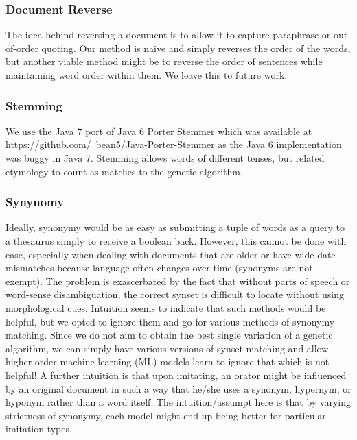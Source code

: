 
\subsubsection{Document Reverse}
The idea behind reversing a document is to allow it to capture paraphrase or out-of-order quoting. Our method is naive and simply reverses the order of the words, but another viable method might be to reverse the order of sentences while maintaining word order within them. We leave this to future work. 

\subsubsection{Stemming}
We use the Java 7 port of Java 6 Porter Stemmer which was available at https://github.com/~bean5/Java-Porter-Stemmer as the Java 6 implementation was buggy in Java 7. Stemming allows words of different tenses, but related etymology to count as matches to the genetic algorithm. 

\subsubsection{Synynomy}
Ideally, synonymy would be as easy as submitting a tuple of words as a query to a thesaurus simply to receive a boolean back. However, this cannot be done with ease, especially when dealing with documents that are older or have wide date mismatches because language often changes over time (synonyms are not exempt). The problem is exascerbated by the fact that without parts of speech or word-sense disambiguation, the correct synset is difficult to locate without using morphological cues. Intuition seems to indicate that such methods would be helpful, but we opted to ignore them and go for various methods of synonymy matching. Since we do not aim to obtain the best single variation of a genetic algorithm, we can simply have various versions of synset matching and allow higher-order machine learning (ML) models learn to ignore that which is not helpful! A further intuition is that upon imitating, an orator might be influenced by an original document in such a way that he/she uses a synonym, hypernym, or hyponym rather than a word itself. The intuition/assumpt here is that by varying strictness of synonymy, each model might end up being better for particular imitation types.

